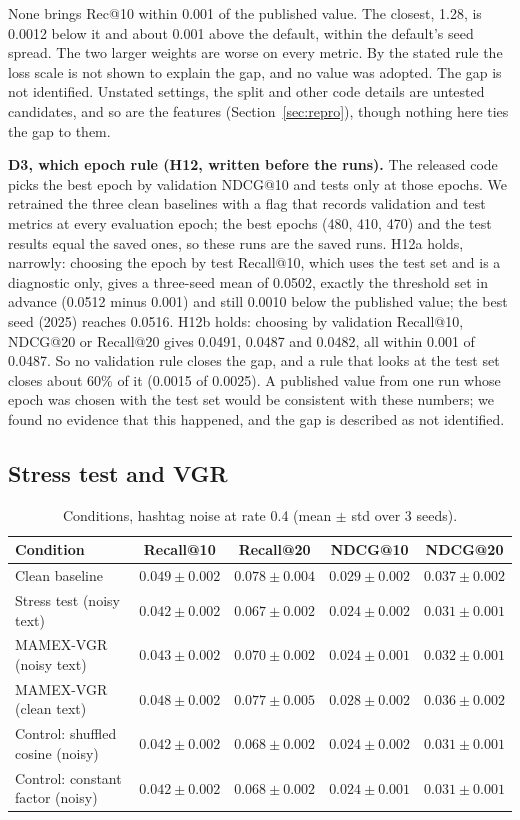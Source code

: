 \documentclass[conference]{IEEEtran}
\begin{document}
None brings Rec@10 within 0.001 of the published value. The closest, 1.28, is 0.0012 below it and about 0.001 above the default, within the default's seed spread. The two larger weights are worse on every metric. By the stated rule the loss scale is not shown to explain the gap, and no value was adopted. The gap is not identified. Unstated settings, the split and other code details are untested candidates, and so are the features (Section~\ref{sec:repro}), though nothing here ties the gap to them.

\textbf{D3, which epoch rule (H12, written before the runs).} The released code picks the best epoch by validation NDCG@10 and tests only at those epochs. We retrained the three clean baselines with a flag that records validation and test metrics at every evaluation epoch; the best epochs (480, 410, 470) and the test results equal the saved ones, so these runs are the saved runs. H12a holds, narrowly: choosing the epoch by test Recall@10, which uses the test set and is a diagnostic only, gives a three-seed mean of 0.0502, exactly the threshold set in advance (0.0512 minus 0.001) and still 0.0010 below the published value; the best seed (2025) reaches 0.0516. H12b holds: choosing by validation Recall@10, NDCG@20 or Recall@20 gives 0.0491, 0.0487 and 0.0482, all within 0.001 of 0.0487. So no validation rule closes the gap, and a rule that looks at the test set closes about 60\% of it (0.0015 of 0.0025). A published value from one run whose epoch was chosen with the test set would be consistent with these numbers; we found no evidence that this happened, and the gap is described as not identified.

\subsection{Stress test and VGR}

\begin{table}[!t]
\centering\footnotesize
\caption{Conditions, hashtag noise at rate 0.4 (mean $\pm$ std over 3 seeds).}
\label{tab:cond}
\begin{tabular}{@{}lcccc@{}}
\toprule
Condition & Recall@10 & Recall@20 & NDCG@10 & NDCG@20 \\
\midrule
Clean baseline & $0.049 \pm 0.002$ & $0.078 \pm 0.004$ & $0.029 \pm 0.002$ & $0.037 \pm 0.002$ \\
Stress test (noisy text) & $0.042 \pm 0.002$ & $0.067 \pm 0.002$ & $0.024 \pm 0.002$ & $0.031 \pm 0.001$ \\
MAMEX-VGR (noisy text) & $0.043 \pm 0.002$ & $0.070 \pm 0.002$ & $0.024 \pm 0.001$ & $0.032 \pm 0.001$ \\
MAMEX-VGR (clean text) & $0.048 \pm 0.002$ & $0.077 \pm 0.005$ & $0.028 \pm 0.002$ & $0.036 \pm 0.002$ \\
Control: shuffled cosine (noisy) & $0.042 \pm 0.002$ & $0.068 \pm 0.002$ & $0.024 \pm 0.002$ & $0.031 \pm 0.001$ \\
Control: constant factor (noisy) & $0.042 \pm 0.002$ & $0.068 \pm 0.002$ & $0.024 \pm 0.001$ & $0.031 \pm 0.001$ \\
\bottomrule
\end{tabular}
\end{table}
\end{document}
